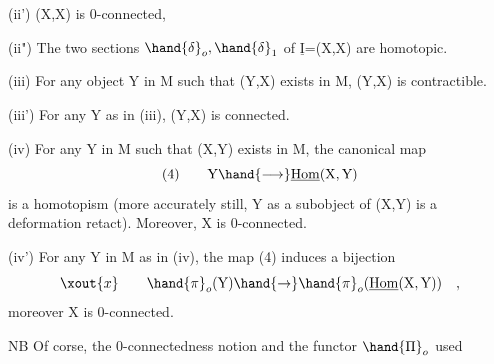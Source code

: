 (ii') \hand{\uline{\textcolor{black}{Hom}}}(X,X) is 0-connected, 

(ii")  The two sections $\hand{\delta}_o,\hand{\delta}_1$ of $\underline{\mathrm{I}}$=\hand{\uline{\textcolor{black}{Hom}}}(X,X) are homotopic.

(iii) For any object Y in M such that \hand{\uline{\textcolor{black}{Hom}}}(Y,X) exists in M, \hand{\uline{\textcolor{black}{Hom}}}(Y,X)
is contractible.

(iii') For any Y as in (iii), \hand{\uline{\textcolor{black}{Hom}}}(Y,X) is connected.

(iv) For any Y in M such that \hand{\uline{\textcolor{black}{Hom}}}(X,Y) exists in M, the canonical
map
\[ (4) \qquad \mathrm{Y} \hand{\longrightarrow} \underline{\mathrm{Hom}}(\mathrm{X},\mathrm{Y}) \]
is a homotopism (more accurately still, Y as a subobject of
\hand{\uline{\textcolor{black}{Hom}}}(X,Y) is a deformation retact). Moreover, X is 0-connected.

(iv') For any Y in M as in (iv), the map (4) induces a bijection 
\[ \xout{x} \qquad \hand{\pi}_o(\mathrm{Y}) \hand{\to} \hand{\pi}_o(\underline{\mathrm{Hom}}(\mathrm{X},\mathrm{Y})) \quad , \]
moreover X is 0-connected.

NB Of corse, the 0-connectedness notion and the functor $\hand{\Pi}_o$ used 

